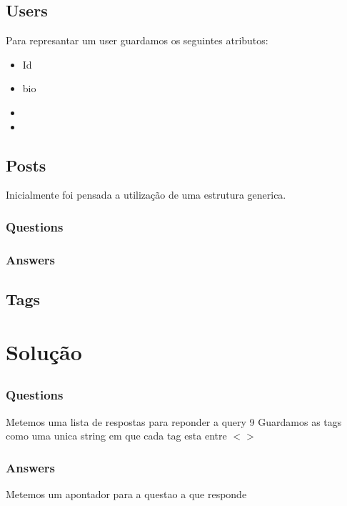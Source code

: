 \documentclass[11pt,a4paper]{report}
\begin{document}
    \section{Users}
    Para represantar um user guardamos os seguintes atributos:
    \begin{itemize}
            \item Id
            \item bio
            \item
            \item
    \end{itemize}

    \section{Posts}
    Inicialmente foi pensada a utilização de uma estrutura generica.

        \subsection{Questions}

        \subsection{Answers}

    \section{Tags}


\chapter{Solução}

    \section{}

        \subsection{Questions}
        Metemos uma lista de respostas para reponder a query 9
        Guardamos as tags como uma unica string em que cada tag esta entre
        $< >$


        \subsection{Answers}
        Metemos um apontador para a questao a que responde
\end{document}

